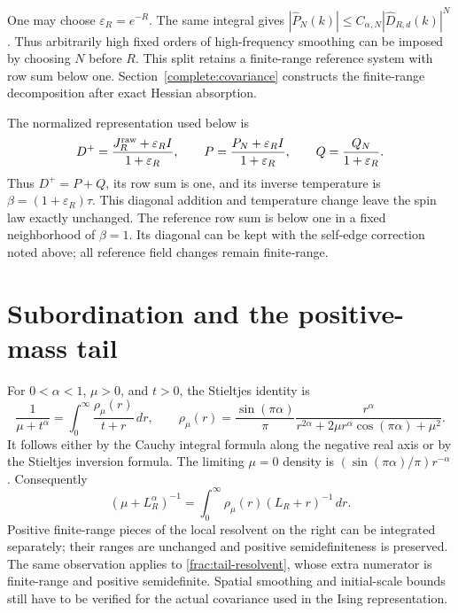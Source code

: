 \documentclass[11pt]{article}
\begin{document}
One may choose \(\varepsilon_R=e^{-R}\). The same integral gives
\(|\widehat P_N(k)|\le C_{\alpha,N}|\widehat D_{R,d}(k)|^N\).
Thus arbitrarily high fixed orders of high-frequency smoothing
can be imposed by choosing \(N\) before \(R\). This split retains
a finite-range reference system with row sum below one. Section~\ref{complete:covariance} constructs the finite-range decomposition after exact Hessian absorption.

The normalized representation used below is
\[
 D^+=\frac{J_R^{\rm raw}+\varepsilon_R I}{1+\varepsilon_R},
 \qquad P=\frac{P_N+\varepsilon_R I}{1+\varepsilon_R},
 \qquad Q=\frac{Q_N}{1+\varepsilon_R}.
\]
Thus \(D^+=P+Q\), its row sum is one, and its inverse temperature
is \(\beta=(1+\varepsilon_R)\tau\). This diagonal addition and
temperature change leave the spin law exactly unchanged.
The reference row sum is below one in a fixed neighborhood of
\(\beta=1\). Its diagonal can be kept with the self-edge correction
noted above; all reference field changes remain finite-range.

\section{Subordination and the positive-mass tail}
\label{frac:subordination}

For \(0<\alpha<1\), \(\mu>0\), and \(t>0\), the Stieltjes
identity is
\begin{equation}\label{frac:stieltjes}
 \frac1{\mu+t^\alpha}
 =\int_0^\infty\frac{\rho_\mu(r)}{t+r}\,dr,\qquad
 \rho_\mu(r)=\frac{\sin(\pi\alpha)}\pi
   \frac{r^\alpha}
   {r^{2\alpha}+2\mu r^\alpha\cos(\pi\alpha)+\mu^2}.
\end{equation}
It follows either by the Cauchy integral formula along the negative
real axis or by the Stieltjes inversion formula. The limiting
\(\mu=0\) density is \((\sin(\pi\alpha)/\pi)r^{-\alpha}\).
Consequently
\[
 (\mu+L_R^\alpha)^{-1}
       =\int_0^\infty\rho_\mu(r)(L_R+r)^{-1}\,dr.
\]
Positive finite-range pieces of the local resolvent on the right
can be integrated separately; their ranges are unchanged and
positive semidefiniteness is preserved. The same observation
applies to \eqref{frac:tail-resolvent}, whose extra numerator is
finite-range and positive semidefinite. Spatial smoothing and
initial-scale bounds still have to be verified for the actual
covariance used in the Ising representation.
\end{document}
